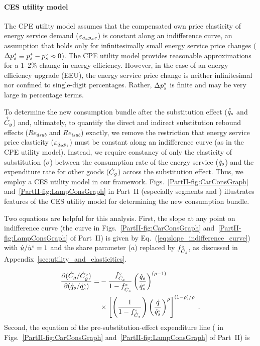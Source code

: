 \paragraph{CES utility model}
\label{sec:Resub_exact_method}

The CPE utility model assumes that
the compensated own price elasticity of energy service demand ($\varepsilon_{\dot{q}_s\!,p_s\!,c}$)
is constant along an indifference curve, an
assumption that holds only
for infinitesimally small energy service price changes
($\Delta {p}^*_s \equiv {p}^*_s - {}{p}^{\scriptscriptstyle \circ}_s \approx 0$).
The CPE utility model provides
reasonable approximations for a 1--2\% change in energy efficiency.
However, in the case of an energy efficiency upgrade (EEU),
the energy service price change is neither infinitesimal nor confined
to single-digit percentages.
Rather,
$\Delta {p}^*_s$ is finite and may be very large in percentage terms.

To determine the new consumption bundle after the substitution effect
($\hat{\dot{q}}_s$ and $\hat{\dot{C}}_g$)
and,
ultimately, to quantify the direct and indirect substitution rebound effects
($Re_{dsub}$ and $Re_{isub}$) exactly,
we remove the restriction that energy service price elasticity
($\varepsilon_{\dot{q}_s\!,p_s}$)
must be constant along an indifference curve
(as in the CPE utility model).
Instead, we require constancy of only
the elasticity of substitution ($\sigma$) between
the consumption rate of the energy service ($\dot{q}_s$)
and the expenditure rate for other goods ($\dot{C}_g$)
across the substitution effect.
Thus, we employ a CES utility model in our framework.
Figs.~\ref{PartII-fig:CarConsGraph}
and~\ref{PartII-fig:LampConsGraph} in Part~II
(especially segments \starc{} and \chat{})
illustrates features
of the CES utility model for determining the new consumption bundle.

Two equations are helpful for this analysis.
First, the slope at any point on indifference curve
(the \iicirc{} curve in
Figs.~\ref{PartII-fig:CarConsGraph}
and~\ref{PartII-fig:LampConsGraph}
of Part~II)
is given by Eq.~(\ref{eq:slope_indifference_curve}) with
$\dot{u}/{}{\dot{u}}^{\scriptscriptstyle \circ} = 1$ and
the share parameter ($a$) replaced by ${}{f}^{\scriptscriptstyle \circ}_{\dot{C}_s}$,
as discussed in Appendix~\ref{sec:utility_and_elasticities}.

\begin{align} \label{eq:slope_indifference_curve_u1}
  \frac{\partial (\dot{C}_g/{}{\dot{C}}^{\scriptscriptstyle \circ}_g)}{\partial (\dot{q}_s/{}{\dot{q}}^{\scriptscriptstyle \circ}_s)} =&
        -\frac{{}{f}^{\scriptscriptstyle \circ}_{\dot{C}_s}}{1 - {}{f}^{\scriptscriptstyle \circ}_{\dot{C}_s}} \left( \frac{\dot{q}_s}{{}{\dot{q}}^{\scriptscriptstyle \circ}_s} \right)^{(\rho -1)} \nonumber  \\
        &\times \left[ \left( \frac{1}{1 - {}{f}^{\scriptscriptstyle \circ}_{\dot{C}_s}} \right)
                          \left( \frac{\dot{q}}{{}{\dot{q}}^{\scriptscriptstyle \circ}_s} \right)^\rho \right]^{(1 - \rho)/\rho} \; .
\end{align}
%
Second, the equation of the pre-substitution-effect expenditure line
(\starstar{} in
Figs.~\ref{PartII-fig:CarConsGraph}
and~\ref{PartII-fig:LampConsGraph}
of Part~II) is


